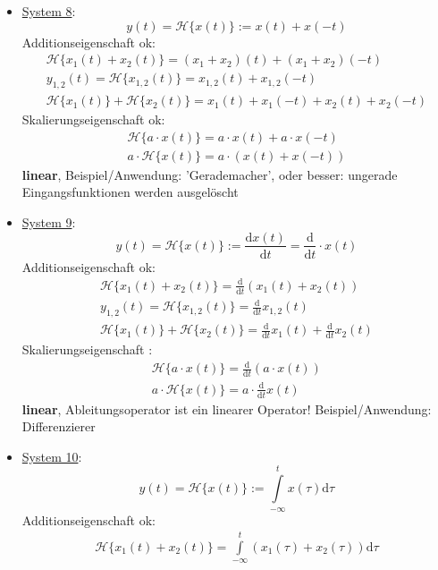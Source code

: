 \documentclass[11pt,a4paper,DIV=12]{scrartcl}
\numberwithin{equation}{section}
\numberwithin{figure}{section}
\newcommand\fsd{\mathrm{d}} %
\newcommand{\sysH}[1]{\mathcal{H}{\{#1\}}}
\begin{document}
\begin{Loesung}
\begin{itemize}
\item  \underline{System 8}:
\begin{equation}
y(t) = \sysH{x(t)}:= x(t) + x(-t)
\end{equation}
Additionseigenschaft ok:
\begin{align}
\sysH{x_1(t)+x_2(t)}=(x_1+x_2)(t)+(x_1+x_2)(-t)\\
y_{1,2}(t) = \sysH{x_{1,2}(t)}= x_{1,2}(t)+x_{1,2}(-t)\\
\sysH{x_1(t)} + \sysH{x_2(t)} = x_{1}(t)+x_{1}(-t) + x_{2}(t)+x_{2}(-t)
\end{align}
Skalierungseigenschaft ok:
\begin{align}
\sysH{a \cdot x(t)}= a \cdot x(t) + a \cdot x(-t)\\
a \cdot \sysH{x(t)}= a \cdot (x(t) + x(-t))
\end{align}
\textbf{linear}, Beispiel/Anwendung: 'Gerademacher', oder besser: ungerade
Eingangsfunktionen werden ausgelöscht
\item  \underline{System 9}:
\begin{equation}
y(t) = \sysH{x(t)}:= \frac{\fsd x(t)}{\fsd t} = \frac{\fsd}{\fsd t} \cdot x(t)
\end{equation}
Additionseigenschaft ok:
\begin{align}
\sysH{x_1(t)+x_2(t)}=\frac{\fsd}{\fsd t} (x_1(t)+x_2(t))\\
y_{1,2}(t) = \sysH{x_{1,2}(t)}= \frac{\fsd}{\fsd t} x_{1,2}(t)\\
\sysH{x_1(t)} + \sysH{x_2(t)} = \frac{\fsd}{\fsd t} x_{1}(t) + \frac{\fsd}{\fsd t} x_{2}(t)
\end{align}
Skalierungseigenschaft :
\begin{align}
\sysH{a \cdot x(t)}= \frac{\fsd}{\fsd t}(a \cdot x(t))\\
a \cdot \sysH{x(t)}= a\cdot \frac{\fsd}{\fsd t} x(t)
\end{align}
\textbf{linear}, Ableitungsoperator ist ein linearer Operator!
Beispiel/Anwendung: Differenzierer
\item  \underline{System 10}:
\begin{equation}
y(t) = \sysH{x(t)}:= \int\limits_{-\infty}^{t} x(\tau) \fsd \tau
\end{equation}
Additionseigenschaft ok:
\begin{align}
\sysH{x_1(t)+x_2(t)}= \int\limits_{-\infty}^{t} (x_1(\tau)+x_2(\tau)) \fsd \tau\\

\end{align}
\end{itemize}
\end{Loesung}
\end{document}
